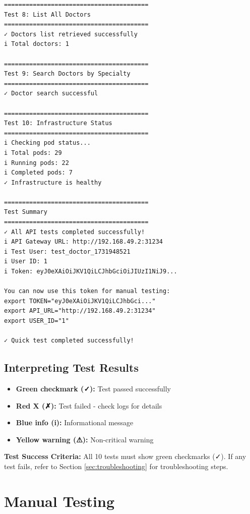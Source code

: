 \documentclass[12pt,a4paper]{article}
\begin{document}
\begin{lstlisting}[style=bash]
========================================
Test 8: List All Doctors
========================================
✓ Doctors list retrieved successfully
i Total doctors: 1

========================================
Test 9: Search Doctors by Specialty
========================================
✓ Doctor search successful

========================================
Test 10: Infrastructure Status
========================================
i Checking pod status...
i Total pods: 29
i Running pods: 22
i Completed pods: 7
✓ Infrastructure is healthy

========================================
Test Summary
========================================
✓ All API tests completed successfully!
i API Gateway URL: http://192.168.49.2:31234
i Test User: test_doctor_1731948521
i User ID: 1
i Token: eyJ0eXAiOiJKV1QiLCJhbGciOiJIUzI1NiJ9...

You can now use this token for manual testing:
export TOKEN="eyJ0eXAiOiJKV1QiLCJhbGci..."
export API_URL="http://192.168.49.2:31234"
export USER_ID="1"

✓ Quick test completed successfully!
\end{lstlisting}

\subsection{Interpreting Test Results}
\begin{itemize}
    \item \textbf{Green checkmark (✓):} Test passed successfully
    \item \textbf{Red X (✗):} Test failed - check logs for details
    \item \textbf{Blue info (i):} Informational message
    \item \textbf{Yellow warning (⚠):} Non-critical warning
\end{itemize}

\begin{successbox}
\textbf{Test Success Criteria:}
All 10 tests must show green checkmarks (✓). If any test fails, refer to Section \ref{sec:troubleshooting} for troubleshooting steps.
\end{successbox}

\section{Manual Testing}
\end{document}
